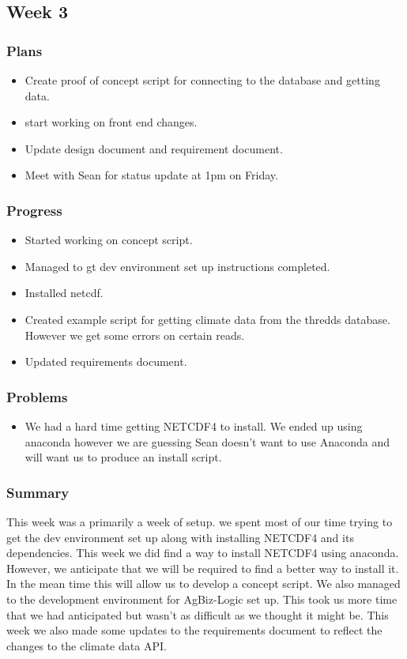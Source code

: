 \documentclass[onecolumn, draftclsnofoot,10pt, compsoc]{article}
\begin{document}
		\subsection{Week 3}
			\subsubsection{Plans}
				\begin{itemize}
					\item Create proof of concept script for connecting to the database and getting data.
					\item start working on front end changes.
					\item Update design document and requirement document.
					\item Meet with Sean for status update at 1pm on Friday.
				\end{itemize}
			\subsubsection{Progress}
				\begin{itemize}
					\item Started working on concept script.
					\item Managed to gt dev environment set up instructions completed.
					\item Installed netcdf.
					\item Created example script for getting climate data from the thredds database. However we get some errors on certain reads.
					\item Updated requirements document.
				\end{itemize}
			\subsubsection{Problems}
				\begin{itemize}
					\item We had a hard time getting NETCDF4 to install. We ended up using anaconda however we are guessing Sean doesn't want to use Anaconda and will want us to produce an install script.\\
				\end{itemize}
			\subsubsection{Summary}
			This week was a primarily a week of setup. we spent most of our time trying to get the dev environment set up along with installing NETCDF4 and its dependencies. This week we did find a way to install NETCDF4 using anaconda. However, we anticipate that we will be required to find a better way to install it. In the mean time this will allow us to develop a concept script. We also managed to the development environment for AgBiz-Logic set up. This took us more time that we had anticipated but wasn't as difficult as we thought it might be. This week we also made some updates to the requirements document to reflect the changes to the climate data API.\\
\end{document}
